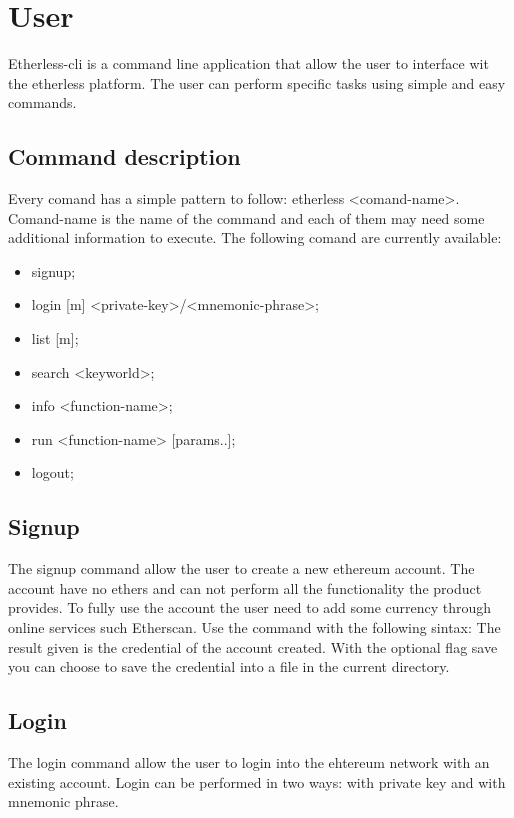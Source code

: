 \section{User}
Etherless-cli is a command line application that allow the user to interface wit the etherless platform. The user can perform specific tasks using simple and easy commands.

\subsection{Command description}
Every comand has a simple pattern to follow: etherless <comand-name>. Comand-name is the name of the command and each of them may need some additional information to execute.
\newline The following comand are currently available:
\begin{itemize}
	\item  signup; 
	\item  login [m] <private-key>/<mnemonic-phrase>; 
	\item  list [m];  
	\item  search <keyworld>;
	\item  info <function-name>;
	\item  run <function-name> [params..];
	\item  logout;
\end{itemize}

\subsection{Signup}
The signup command allow the user to create a new ethereum account. The account have no ethers and can not perform all the functionality the product provides.
To fully use the account the user need to add some currency through online services such Etherscan.
Use the command with the following sintax:
\newline The result given is the credential of the account created.
With the optional flag save you can choose to save the credential into a file in the current directory.

\subsection{Login}
The login command allow the user to login into the ehtereum network with an existing account.
Login can be performed in two ways: with private key and with mnemonic phrase.

